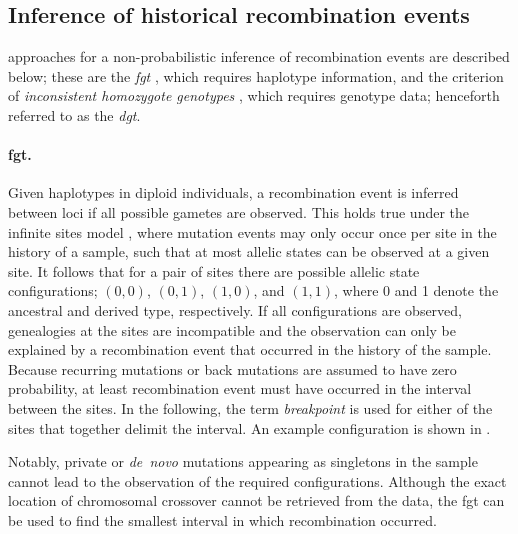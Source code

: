 %
\subsection{Inference of historical recombination events}
%

 approaches for a non-probabilistic inference of recombination events are described below; these are the \emph{\acrlong{fgt}} \citep{Hudson:1985wh}, which requires haplotype information, and the criterion of \emph{inconsistent homozygote genotypes} \citep[see][]{Mathieson:2014ig}, which requires genotype data; henceforth referred to as the \emph{\acrlong{dgt}}.

\paragraph{\Gls{fgt}.}
Given  haplotypes in  diploid individuals, a recombination event is inferred between  loci if all  possible gametes are observed.
This holds true under the infinite sites model \citep{Kimura:1969tn}, where mutation events may only occur once per site in the history of a sample, such that at most  allelic states can be observed at a given site.
It follows that for a pair of sites there are  possible allelic state configurations; ${(0,0)}$, ${(0,1)}$, ${(1,0)}$, and ${(1,1)}$, where 0 and 1 denote the ancestral and derived type, respectively.
If all  configurations are observed, genealogies at the  sites are incompatible and the observation can only be explained by a recombination event that occurred in the history of the sample.
Because recurring mutations or back mutations are assumed to have zero probability, at least  recombination event must have occurred in the interval between the  sites.
In the following, the term \emph{breakpoint} is used for either of the  sites that together delimit the interval.
An example configuration is shown in .

%

%

Notably, private or \emph{de~novo} mutations appearing as singletons in the sample cannot lead to the observation of the  required configurations.
Although the exact location of chromosomal crossover cannot be retrieved from the data, the \gls{fgt} can be used to find the smallest interval in which recombination occurred.


